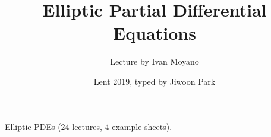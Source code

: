 \documentclass[12pt,a4paper]{article}
\DeclarePairedDelimiter\bignorm{\lVert}{\rVert}
\newcommand{\doublerule}[1][.4pt]{%
  \noindent
  \makebox[0pt][l]{\rule[.7ex]{\linewidth}{#1}}%
  \rule[.3ex]{\linewidth}{#1}}
\begin{document}
\title{Elliptic Partial Differential Equations}
\author{Lecture by Ivan Moyano}
\date{Lent 2019, typed by Jiwoon Park}

\maketitle

\newcommand{\latinmodern}[1]{{\fontfamily{lmss}\selectfont
\textbf{#1}
}}

\newcommand{\thm}{\latinmodern{Theorem) }}
\newcommand{\thmnum}[1]{\latinmodern{Theorem #1) }}
\newcommand{\defi}{\latinmodern{Definition) }}
\newcommand{\definum}[1]{\latinmodern{Definition #1) }}
\newcommand{\lem}{\latinmodern{Lemma) }}
\newcommand{\lemnum}[1]{\latinmodern{Lemma #1) }}
\newcommand{\prop}{\latinmodern{Proposition) }}
\newcommand{\propnum}[1]{\latinmodern{Proposition #1) }}
\newcommand{\corr}{\latinmodern{Corollary) }}
\newcommand{\corrnum}[1]{\latinmodern{Corollary #1) }}
\newcommand{\pf}{\textbf{proof) }}

\newcommand{\lap}{\triangle} %
\newcommand{\s}{\vspace{10pt}}
\newcommand{\bull}{$\bullet$}
\newcommand{\sta}{$\star$}
\newcommand{\reals}{\mathbb{R}}

\newcommand{\norms}[2]{\bignorm[\big]{#1}_{#2}}
\newcommand{\snorms}[2]{\bignorm[\small]{#1}_{#2}}

\newcommand{\eop}{\hfill  \textsl{(End of proof)} $\square$} %
\newcommand{\eos}{\hfill  \textsl{(End of statement)} $\square$} %

\newcommand{\intN}{\mathbb{Z}_N}
\newcommand{\nat}{\mathbb{N}}

\newcommand{\abs}[1]{\big| #1 \big|}
\newcommand{\avg}{\mathbb{E}}
\newcommand{\prob}{\mathbb{P}}
\newcommand{\borel}{\mathscr{B}}
\newcommand{\EE}{\mathscr{E}}
\newcommand{\pa}{\partial}

\newcommand{\call}[1]{\quad \cdots\cdots\cdots\,\,(#1)}

\renewcommand{\vec}{\underline}
\renewcommand{\bar}{\overline}

\def\doubleunderline#1{\underline{\underline{#1}}}

\newcommand{\newday}{\doublerule[0.5pt]}
\newcommand{\digression}{**********************************************************************************************}

\setlength\parindent{0pt}
\s

Elliptic PDEs (24 lectures, 4 example sheets).
\end{document}
